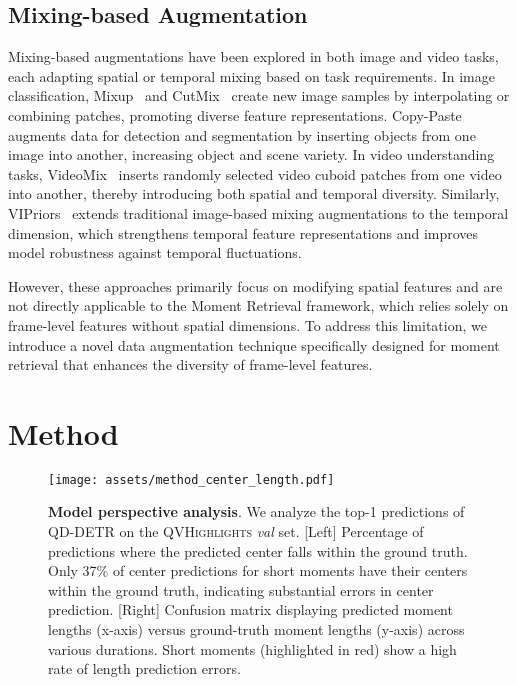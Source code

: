 \subsection{Mixing-based Augmentation}
Mixing-based augmentations have been explored in both image and video tasks, each adapting spatial or temporal mixing based on task requirements.
In image classification, Mixup~\cite{zhang2017mixup} and CutMix~\cite{yun2019cutmix} create new image samples by interpolating or combining patches, promoting diverse feature representations. Copy-Paste~\cite{ghiasi2021copypaste} augments data for detection and segmentation by inserting objects from one image into another, increasing object and scene variety.
In video understanding tasks, VideoMix~\cite{yun2020videomix} inserts randomly selected video cuboid patches from one video into another, thereby introducing both spatial and temporal diversity. Similarly, VIPriors~\cite{kim2020VIPriors} extends traditional image-based mixing augmentations to the temporal dimension, which strengthens temporal feature representations and improves model robustness against temporal fluctuations.

However, these approaches primarily focus on modifying spatial features and are not directly applicable to the Moment Retrieval framework, which relies solely on frame-level features without spatial dimensions. To address this limitation, we introduce a novel data augmentation technique specifically designed for moment retrieval that enhances the diversity of frame-level features. 

\section{Method}
\label{sec:method}

\begin{figure}[tb]
    \centering
    \texttt{[image: assets/method\_center\_length.pdf]}
    \caption{ \textbf{Model perspective analysis}.     We analyze the top-1 predictions of QD-DETR on the \textsc{QVHighlights} \textit{val} set.     
    [Left] Percentage of predictions where the predicted center falls within the ground truth. Only 37\% of center predictions for short moments have their centers within the ground truth, indicating substantial errors in center prediction.
    [Right] Confusion matrix displaying predicted moment lengths (x-axis) versus ground-truth moment lengths (y-axis) across various durations. Short moments (highlighted in red) show a high rate of length prediction errors. 
    }
    \label{fig:method_predictions}
\end{figure}

